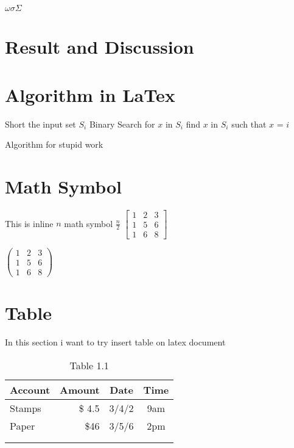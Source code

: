 \documentclass[conference]{IEEEtran}
\begin{document}
\bigskip

$ \omega  \sigma \Sigma $



\section{Result and Discussion}


\section{Algorithm in LaTex}
\begin{algorithm}
	\begin{algorithmic}
		\STATE Short the input set $S_i$
		\STATE Binary Search for $x$ in $S_i$
				\STATE find $x$ in $S_i$ such that $x$ = $i$
					\ENDIF
			\ENDFOR 
	\end{algorithmic}
	\caption{Algorithm for stupid work}
	\label{algo:stupid}
\end{algorithm}

\section{Math Symbol}
This is inline $n$ math symbol $\frac{n}{2}$
$
\left[
	\begin{array}{ccc}
	1&2&3\\
	1&5&6\\
	1&6&8
	\end{array}
\right]
$

$
\left(
	\begin{array}{ccc}
	1&2&3\\
	1&5&6\\
	1&6&8
	\end{array}
\right)
$

\section{Table}
In this section i want to try insert table on latex document 
\begin{table}
	\caption{Table 1.1}
	\label{table:gembus}
	\centering
	\begin{tabular}{|l|r|cc|}
	\hline
	Account & Amount & Date & Time\\
	\hline 
	Stamps & \$ 4.5&3/4/2 & 9am\\
	Paper &\$46 & 3/5/6 & 2pm\\
	&&&\\
	&&&\\
	\hline
	\end{tabular}
\end{table}
\end{document}
